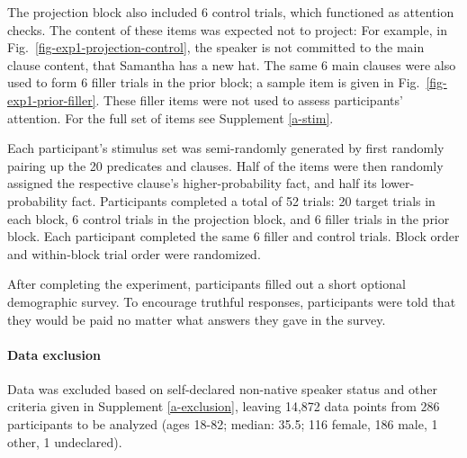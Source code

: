 \documentclass[11pt,fleqn]{article}
\newcommand{\6}{\mbox{$[\hspace*{-.6mm}[$}}
\newcommand{\9}{\mbox{$]\hspace*{-.6mm}]$}}
\begin{document}



The projection block also included 6 control trials, which functioned as attention checks. The content of these items was expected not to project: For example, in Fig.~\ref{fig-exp1-projection-control}, the speaker is not committed to the main clause content, that Samantha has a new hat. The same 6 main clauses were also used to form 6 filler trials in the prior block; a sample item is given in Fig.~\ref{fig-exp1-prior-filler}. These filler items were not used to assess participants' attention. For the full set of items see Supplement \ref{a-stim}.


Each participant's stimulus set was semi-randomly generated by first randomly pairing up the 20 predicates and clauses. Half of the items were then randomly assigned the respective clause's higher-probability fact, and half its lower-probability fact. Participants completed a total of 52 trials: 20 target trials in each block, 6 control trials in the projection block, and 6 filler trials in the prior block. Each participant completed the same 6 filler and control trials. Block order and within-block trial order were randomized.



After completing the experiment, participants filled out a short optional demographic survey. To encourage truthful responses, participants were told that they would be paid no matter what answers they gave in the survey.

\paragraph{Data exclusion} Data was excluded based on self-declared non-native speaker status and other criteria given in Supplement \ref{a-exclusion}, leaving 14,872 data points from 286 participants to be analyzed (ages 18-82; median: 35.5; 116 female, 186 male, 1 other, 1 undeclared).
\end{document}
